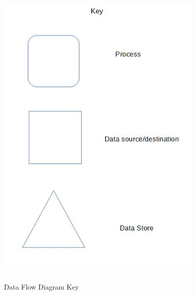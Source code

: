 \begin{figure}[H]
	\centering
	\includegraphics[width= 10cm, height = 15.5cm]{Analysis/images/dfd_key.JPG}
	\caption {Data Flow Diagram Key} \label{fig:data_diagram_key}
\end{figure}

